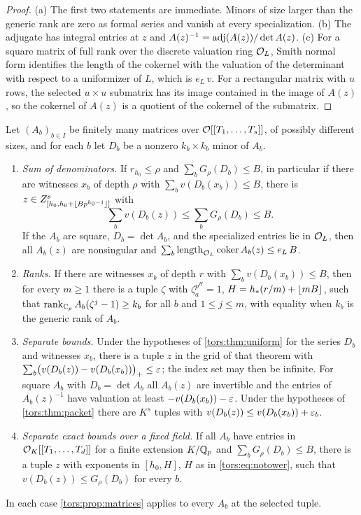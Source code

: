\begin{proof}
(a) The first two statements are immediate. Minors of size larger than the generic rank
are zero as formal series and vanish at every specialization. (b) The adjugate has
integral entries at $z$ and $A(z)^{-1}=\operatorname{adj}(A(z))/\det A(z)$. (c) For a square matrix
of full rank over the discrete valuation ring $\mathcal{O}_L$, Smith normal form identifies the
length of the cokernel with the valuation of the determinant with respect to a
uniformizer of $L$, which is $e_L\,v$. For a rectangular matrix with $u$ rows, the
selected $u\times u$ submatrix has its image contained in the image of $A(z)$, so the
cokernel of $A(z)$ is a quotient of the cokernel of the submatrix.
\end{proof}

\begin{corollary}
\label{tors:cor:minors}
Let $(A_b)_{b\in I}$ be finitely many matrices over $\mathcal{O}[[T_1,\dots,T_s]]$, of possibly
different sizes, and for each $b$ let $D_b$ be a nonzero $k_b\times k_b$ minor of $A_b$.
\begin{enumerate}[label=\textup{(\alph*)}]
\item \emph{Sum of denominators.} If $r_{h_0}\le\rho$ and $\sum_bG_\rho(D_b)\le B$, in
  particular if there are witnesses $x_b$ of depth $\rho$ with $\sum_bv(D_b(x_b))\le B$,
  there is $z\in Z_{[h_0,h_0+\lfloor Bp^{h_0-1}\rfloor]}^s$ with
  \[
    \sum_bv(D_b(z))\le\sum_bG_\rho(D_b)\le B .
  \]
  If the $A_b$ are square, $D_b=\det A_b$, and the specialized entries lie in $\mathcal{O}_L$,
  then all $A_b(z)$ are nonsingular and
  $\sum_b\operatorname{length}_{\mathcal{O}_L}\operatorname{coker} A_b(z)\le e_L\,B$.
\item \emph{Ranks.} If there are witnesses $x_b$ of depth $r$ with
  $\sum_bv(D_b(x_b))\le B$, then for every $m\ge1$ there is a tuple $\zeta$ with
  $\zeta_a^{p^H}=1$, $H=h_*(r/m)+\lfloor mB\rfloor$, such that
  $\operatorname{rank}_{\mathbb{C}_p}A_b(\zeta^j-1)\ge k_b$ for all $b$ and $1\le j\le m$, with equality when
  $k_b$ is the generic rank of $A_b$.
\item \emph{Separate bounds.} Under the hypotheses of \cref{tors:thm:uniform} for the
  series $D_b$ and witnesses $x_b$, there is a tuple $z$ in the grid of that theorem with
  $\sum_b\bigl(v(D_b(z))-v(D_b(x_b))\bigr)_+\le\varepsilon$; the index set may then be infinite.
  For square $A_b$ with $D_b=\det A_b$ all $A_b(z)$ are invertible and the entries of
  $A_b(z)^{-1}$ have valuation at least $-v(D_b(x_b))-\varepsilon$. Under the hypotheses of
  \cref{tors:thm:packet} there are $K^s$ tuples with $v(D_b(z))\le v(D_b(x_b))+\varepsilon_b$.
\item \emph{Separate exact bounds over a fixed field.} If all $A_b$ have entries in
  $\mathcal{O}_K[[T_1,\dots,T_d]]$ for a finite extension $K/\mathbb{Q}_p$ and $\sum_bG_\rho(D_b)\le B$,
  there is a tuple $z$ with exponents in $[h_0,H]$, $H$ as in \eqref{tors:eq:notower},
  such that $v(D_b(z))\le G_\rho(D_b)$ for every $b$.
\end{enumerate}
In each case \cref{tors:prop:matrices} applies to every $A_b$ at the selected tuple.
\end{corollary}

